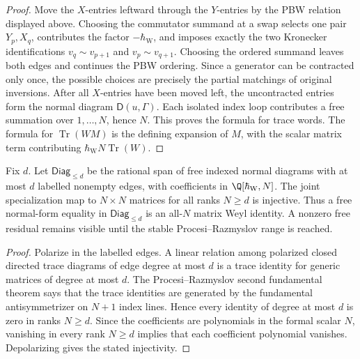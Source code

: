 \begin{proof}
  Move the \(X\)-entries leftward through the \(Y\)-entries by the PBW
  relation displayed above.  Choosing the commutator summand at a swap
  selects one pair \(Y_p,X_q\), contributes the factor \(-\hbar_{\mathrm{W}}\), and
  imposes exactly the two Kronecker identifications
  \(v_q\sim v_{p+1}\) and \(v_p\sim v_{q+1}\).  Choosing the ordered
  summand leaves both edges and continues the PBW ordering.  Since a
  generator can be contracted only once, the possible choices are
  precisely the partial matchings of original inversions.  After all
  \(X\)-entries have been moved left, the uncontracted entries form the
  normal diagram \(\mathsf D(u,\Gamma)\).  Each isolated index loop
  contributes a free summation over \(1,\ldots,N\), hence \(N\).  This
  proves the formula for trace words.  The formula for
  \(\operatorname{Tr}(W M)\) is the defining expansion of \(M\), with the
  scalar matrix term contributing \(\hbar_{\mathrm{W}} N\operatorname{Tr}(W)\).
\end{proof}

\begin{lem}
\label{lem:app-free-trace-diagram-stable-injectivity}
  Fix \(d\).  Let \(\mathsf{Diag}_{\le d}\) be the rational span of free
  indexed normal diagrams with at most \(d\) labelled nonempty edges,
  with coefficients in \(\Q[\hbar_{\mathrm{W}},N]\).  The joint specialization map
  to \(N\times N\) matrices for all ranks \(N\ge d\) is injective.  Thus
  a free normal-form equality in \(\mathsf{Diag}_{\le d}\) is an all-\(N\)
  matrix Weyl identity.  A nonzero free residual remains visible until
  the stable Procesi--Razmyslov range is reached.
\end{lem}

\begin{proof}
  Polarize in the labelled edges.  A linear relation among polarized
  closed directed trace diagrams of edge degree at most \(d\) is a trace
  identity for generic matrices of degree at most \(d\).  The
  Procesi--Razmyslov second fundamental theorem says that the trace
  identities are generated by the fundamental antisymmetrizer on
  \(N+1\) index lines.  Hence every identity of degree at most
  \(d\) is zero in ranks \(N\ge d\).  Since the coefficients are
  polynomials in the formal scalar \(N\), vanishing in every rank
  \(N\ge d\) implies that each coefficient polynomial vanishes.  Depolarizing
  gives the stated injectivity.
\end{proof}

